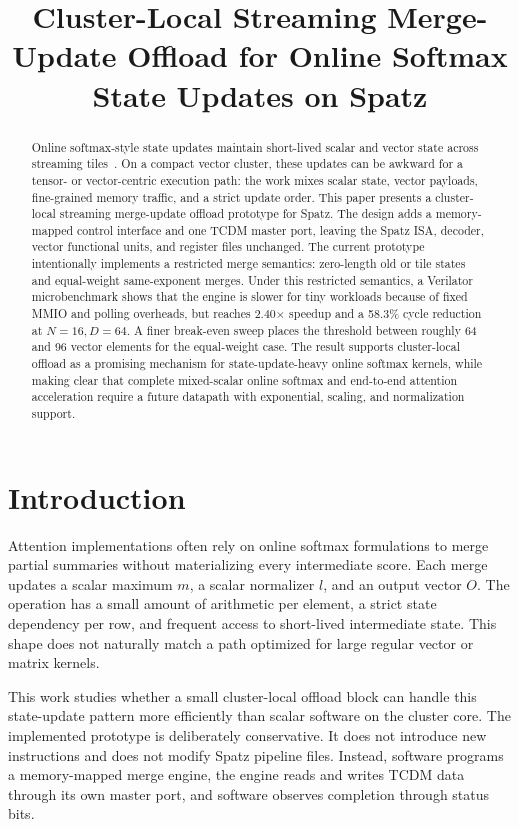 \documentclass[conference]{IEEEtran}
\title{Cluster-Local Streaming Merge-Update Offload for Online Softmax State Updates on Spatz}
\author{
  \IEEEauthorblockN{Wenxuan Tang}
  \IEEEauthorblockA{Local Spatz Prototype Study}
}
\begin{document}
\maketitle

\begin{abstract}
Online softmax-style state updates maintain short-lived scalar and vector
state across streaming tiles~\cite{online-softmax2018}. On a compact vector
cluster, these updates can be
awkward for a tensor- or vector-centric execution path: the work mixes scalar
state, vector payloads, fine-grained memory traffic, and a strict update order.
This paper presents a cluster-local streaming merge-update offload prototype
for Spatz. The design adds a memory-mapped control interface and one TCDM
master port, leaving the Spatz ISA, decoder, vector functional units, and
register files unchanged. The current prototype intentionally implements a
restricted merge semantics: zero-length old or tile states and equal-weight
same-exponent merges. Under this restricted semantics, a Verilator
microbenchmark shows that the engine is slower for tiny workloads because of
fixed MMIO and polling overheads, but reaches 2.40$\times$ speedup and a
58.3\% cycle reduction at $N=16,D=64$. A finer break-even sweep places the
threshold between roughly 64 and 96 vector elements for the equal-weight case.
The result supports cluster-local offload as a promising mechanism for
state-update-heavy online softmax kernels, while making clear that complete
mixed-scalar online softmax and end-to-end attention acceleration require a
future datapath with exponential, scaling, and normalization support.
\end{abstract}

\section{Introduction}

Attention implementations often rely on online softmax formulations to merge
partial summaries without materializing every intermediate score. Each merge
updates a scalar maximum $m$, a scalar normalizer $l$, and an output vector
$O$. The operation has a small amount of arithmetic per element, a strict state
dependency per row, and frequent access to short-lived intermediate state. This
shape does not naturally match a path optimized for large regular vector or
matrix kernels.

This work studies whether a small cluster-local offload block can handle this
state-update pattern more efficiently than scalar software on the cluster core.
The implemented prototype is deliberately conservative. It does not introduce
new instructions and does not modify Spatz pipeline files. Instead, software
programs a memory-mapped merge engine, the engine reads and writes TCDM data
through its own master port, and software observes completion through status
bits.
\end{document}
